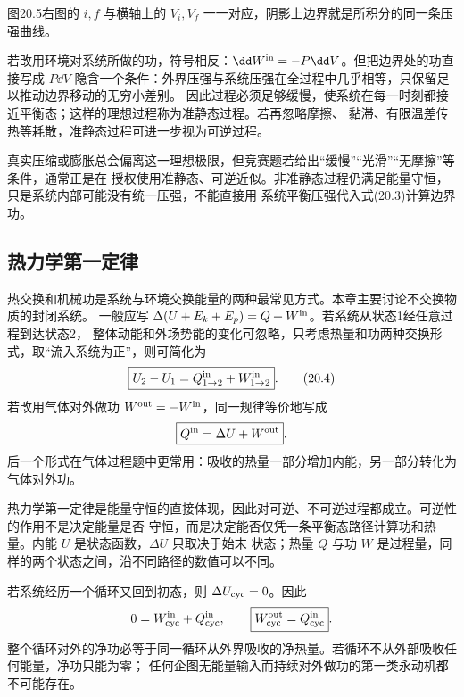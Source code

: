 \pistonWorkFaithful
{}
图20.5右图的 $i,f$ 与横轴上的 $V_i,V_f$ 一一对应，阴影上边界就是所积分的同一条压强曲线。

若改用环境对系统所做的功，符号相反：$\dd W^{\rm in}=-P\dd V$。但把边界处的功直接写成
$P\dd V$ 隐含一个条件：外界压强与系统压强在全过程中几乎相等，只保留足以推动边界移动的无穷小差别。
因此过程必须足够缓慢，使系统在每一时刻都接近平衡态；这样的理想过程称为准静态过程。若再忽略摩擦、
黏滞、有限温差传热等耗散，准静态过程可进一步视为可逆过程。

真实压缩或膨胀总会偏离这一理想极限，但竞赛题若给出“缓慢”“光滑”“无摩擦”等条件，通常正是在
授权使用准静态、可逆近似。非准静态过程仍满足能量守恒，只是系统内部可能没有统一压强，不能直接用
系统平衡压强代入式(20.3)计算边界功。

\subsection*{热力学第一定律}

热交换和机械功是系统与环境交换能量的两种最常见方式。本章主要讨论不交换物质的封闭系统。
一般应写 $\Delta(U+E_k+E_p)=Q+W^{\rm in}$。若系统从状态1经任意过程到达状态2，
整体动能和外场势能的变化可忽略，只考虑热量和功两种交换形式，取“流入系统为正”，则可简化为
\begin{equation}
  \boxed{U_2-U_1=Q^{\rm in}_{1\to2}+W^{\rm in}_{1\to2}}. \tag{20.4}
\end{equation}
若改用气体对外做功 $W^{\rm out}=-W^{\rm in}$，同一规律等价地写成
\begin{equation*}
  \boxed{Q^{\rm in}=\Delta U+W^{\rm out}}.
\end{equation*}
后一个形式在气体过程题中更常用：吸收的热量一部分增加内能，另一部分转化为气体对外功。

热力学第一定律是能量守恒的直接体现，因此对可逆、不可逆过程都成立。可逆性的作用不是决定能量是否
守恒，而是决定能否仅凭一条平衡态路径计算功和热量。内能 $U$ 是状态函数，$\Delta U$ 只取决于始末
状态；热量 $Q$ 与功 $W$ 是过程量，同样的两个状态之间，沿不同路径的数值可以不同。

若系统经历一个循环又回到初态，则 $\Delta U_{\rm cyc}=0$。因此
\begin{equation*}
  0=W^{\rm in}_{\rm cyc}+Q^{\rm in}_{\rm cyc},
  \qquad
  \boxed{W^{\rm out}_{\rm cyc}=Q^{\rm in}_{\rm cyc}}.
\end{equation*}
整个循环对外的净功必等于同一循环从外界吸收的净热量。若循环不从外部吸收任何能量，净功只能为零；
任何企图无能量输入而持续对外做功的第一类永动机都不可能存在。

